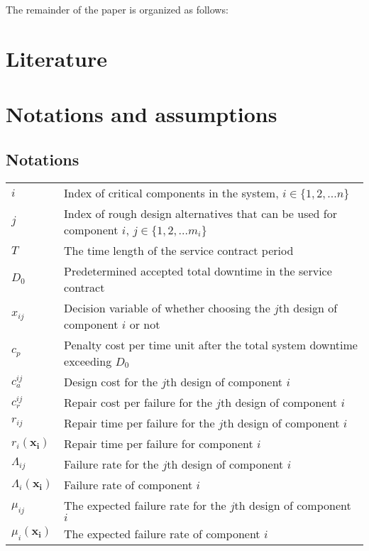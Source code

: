 \documentclass[preprint,12pt]{elsarticle}
\begin{document}
The remainder of the paper is organized as follows:
\section{Literature}

\section{Notations and assumptions}
 \subsection{Notations}
   \begin{tabular}{l l}
$i$ & Index of critical components in the system, $i \in \{1,2,...n\}$\\
$j$ & Index of rough design alternatives that can be used for component $i$, $j \in \{1,2,...m_{i}\}$\\
$T$ & The time length of the service contract period\\
$D_0$ & Predetermined accepted total downtime in the service contract\\
$x_{ij}$ & Decision variable of whether choosing the $j$th design of component $i$ or not\\
$c_p$ & Penalty cost per time unit after the total system downtime exceeding $D_0$\\
$c^{ij}_{a}$ & Design cost for the $j$th design of component $i$\\
$c_r^{ij}$ & Repair cost per failure for the $j$th design of component $i$\\
$r_{ij}$ & Repair time per failure for the $j$th design of component $i$\\
$r_{i}(\boldsymbol{x_{i}})$ & Repair time per failure for component $i$\\
$\Lambda_{ij}$ & Failure rate for the $j$th design of component $i$\\
$\Lambda_{i}(\boldsymbol{x_{i}})$  & Failure rate of component $i$\\
$\mu_{ij}$ & The expected failure rate for the $j$th design of component $i$ \\
$\mu_{i}(\boldsymbol{x_{i}})$ & The expected failure rate of component $i$ \\

\end{tabular}
\end{document}
